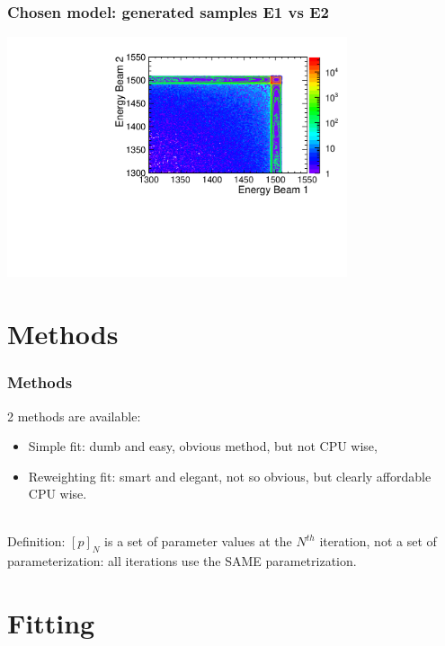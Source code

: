 \documentclass{beamer}
\begin{document}
\begin{frame}
\frametitle{Chosen model: generated samples E1 vs E2}
\includegraphics[width=10cm]{E1_vs_E2_gen}
\end{frame}


\section{Methods}
\begin{frame}
\frametitle{Methods}
2 methods are available:
\begin{itemize}
\item Simple fit: dumb and easy, obvious method, but not CPU wise,
\item Reweighting fit: smart and elegant, not so obvious, but clearly affordable CPU wise.
\end{itemize}
~\\
Definition: \alert{$[p]_N$ is a set of parameter values} at the $N^{th}$
iteration, not a set of parameterization: all iterations use the SAME parametrization.
\end{frame}
\section{Fitting}
\end{document}
